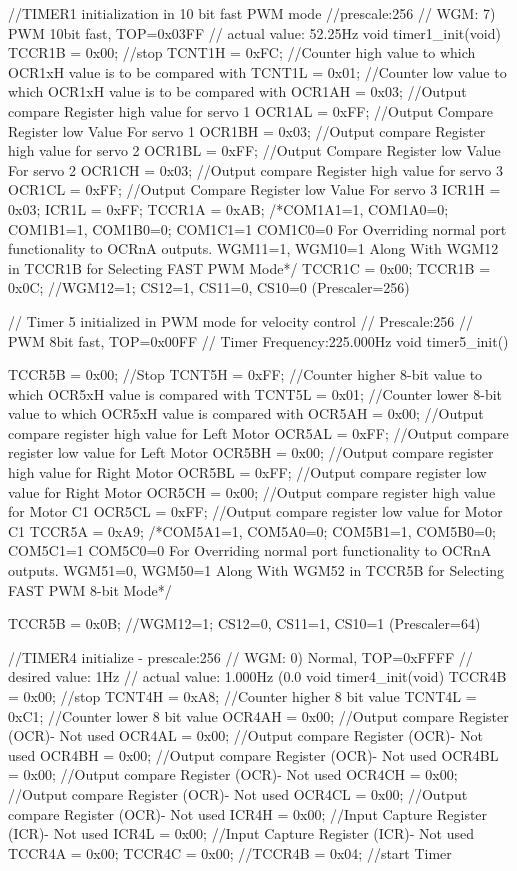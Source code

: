 //TIMER1 initialization in 10 bit fast PWM mode  
//prescale:256
// WGM: 7) PWM 10bit fast, TOP=0x03FF
// actual value: 52.25Hz 
void timer1_init(void)
{
 TCCR1B = 0x00; //stop
 TCNT1H = 0xFC; //Counter high value to which OCR1xH value is to be compared with
 TCNT1L = 0x01;	//Counter low value to which OCR1xH value is to be compared with
 OCR1AH = 0x03;	//Output compare Register high value for servo 1
 OCR1AL = 0xFF;	//Output Compare Register low Value For servo 1
 OCR1BH = 0x03;	//Output compare Register high value for servo 2
 OCR1BL = 0xFF;	//Output Compare Register low Value For servo 2
 OCR1CH = 0x03;	//Output compare Register high value for servo 3
 OCR1CL = 0xFF;	//Output Compare Register low Value For servo 3
 ICR1H  = 0x03;	
 ICR1L  = 0xFF;
 TCCR1A = 0xAB; /*{COM1A1=1, COM1A0=0; COM1B1=1, COM1B0=0; COM1C1=1 COM1C0=0}
 					For Overriding normal port functionality to OCRnA outputs.
				  {WGM11=1, WGM10=1} Along With WGM12 in TCCR1B for Selecting FAST PWM Mode*/
 TCCR1C = 0x00;
 TCCR1B = 0x0C; //WGM12=1; CS12=1, CS11=0, CS10=0 (Prescaler=256)
}

// Timer 5 initialized in PWM mode for velocity control
// Prescale:256
// PWM 8bit fast, TOP=0x00FF
// Timer Frequency:225.000Hz
void timer5_init()
{
	TCCR5B = 0x00;	//Stop
	TCNT5H = 0xFF;	//Counter higher 8-bit value to which OCR5xH value is compared with
	TCNT5L = 0x01;	//Counter lower 8-bit value to which OCR5xH value is compared with
	OCR5AH = 0x00;	//Output compare register high value for Left Motor
	OCR5AL = 0xFF;	//Output compare register low value for Left Motor
	OCR5BH = 0x00;	//Output compare register high value for Right Motor
	OCR5BL = 0xFF;	//Output compare register low value for Right Motor
	OCR5CH = 0x00;	//Output compare register high value for Motor C1
	OCR5CL = 0xFF;	//Output compare register low value for Motor C1
	TCCR5A = 0xA9;	/*{COM5A1=1, COM5A0=0; COM5B1=1, COM5B0=0; COM5C1=1 COM5C0=0}
 					  For Overriding normal port functionality to OCRnA outputs.
				  	  {WGM51=0, WGM50=1} Along With WGM52 in TCCR5B for Selecting FAST PWM 8-bit Mode*/
	
	TCCR5B = 0x0B;	//WGM12=1; CS12=0, CS11=1, CS10=1 (Prescaler=64)
}

//TIMER4 initialize - prescale:256
// WGM: 0) Normal, TOP=0xFFFF
// desired value: 1Hz
// actual value:  1.000Hz (0.0%
void timer4_init(void)
{
	TCCR4B = 0x00; //stop
	TCNT4H = 0xA8; //Counter higher 8 bit value
	TCNT4L = 0xC1; //Counter lower 8 bit value
	OCR4AH = 0x00; //Output compare Register (OCR)- Not used
	OCR4AL = 0x00; //Output compare Register (OCR)- Not used
	OCR4BH = 0x00; //Output compare Register (OCR)- Not used
	OCR4BL = 0x00; //Output compare Register (OCR)- Not used
	OCR4CH = 0x00; //Output compare Register (OCR)- Not used
	OCR4CL = 0x00; //Output compare Register (OCR)- Not used
	ICR4H  = 0x00; //Input Capture Register (ICR)- Not used
	ICR4L  = 0x00; //Input Capture Register (ICR)- Not used
	TCCR4A = 0x00;
	TCCR4C = 0x00;
	//TCCR4B = 0x04; //start Timer
}


